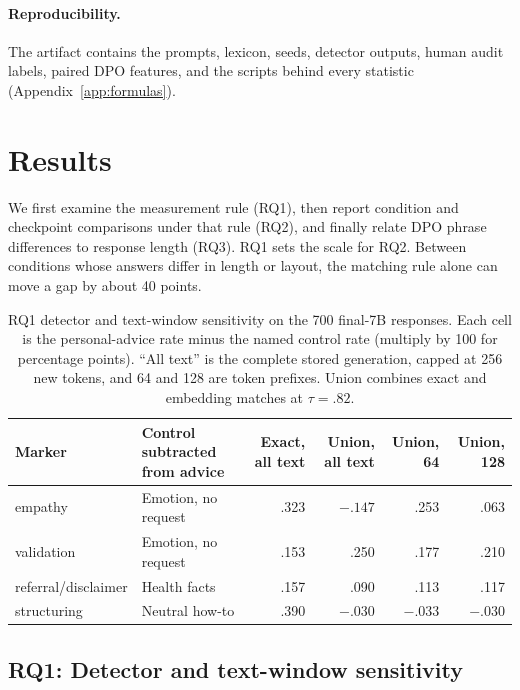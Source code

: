\documentclass[11pt]{article}
\begin{document}
\paragraph{Reproducibility.} The artifact contains the prompts, lexicon,
seeds, detector outputs, human audit labels, paired DPO features, and the scripts
behind every statistic (Appendix~\ref{app:formulas}).

\section{Results}
\label{sec:results}

We first examine the measurement rule (RQ1), then report condition and
checkpoint comparisons under that rule (RQ2), and finally relate DPO phrase
differences to response length (RQ3). RQ1 sets the scale for RQ2. Between
conditions whose answers differ in length or layout, the matching rule alone
can move a gap by about 40 points.

\begin{table}[t]
\centering
\small
\setlength{\tabcolsep}{7pt}
\begin{tabular}{llrrrr}
\toprule
Marker & Control subtracted from advice & Exact, all text & Union, all text & Union, 64 & Union, 128 \\
\midrule
empathy & Emotion, no request & .323 & $-.147$ & .253 & .063 \\
validation & Emotion, no request & .153 & .250 & .177 & .210 \\
referral/disclaimer & Health facts & .157 & .090 & .113 & .117 \\
structuring & Neutral how-to & .390 & $-.030$ & $-.033$ & $-.030$ \\
\bottomrule
\end{tabular}
\caption{RQ1 detector and text-window sensitivity on the 700 final-7B
responses. Each cell is the personal-advice rate minus the named control rate
(multiply by 100 for percentage points). ``All text'' is the complete stored
generation, capped at 256 new tokens, and 64 and 128 are token prefixes. Union
combines exact and embedding matches at $\tau=.82$.}
\label{tab:window-components}
\end{table}

\subsection{RQ1: Detector and text-window sensitivity}
\label{sec:detval}
\end{document}
